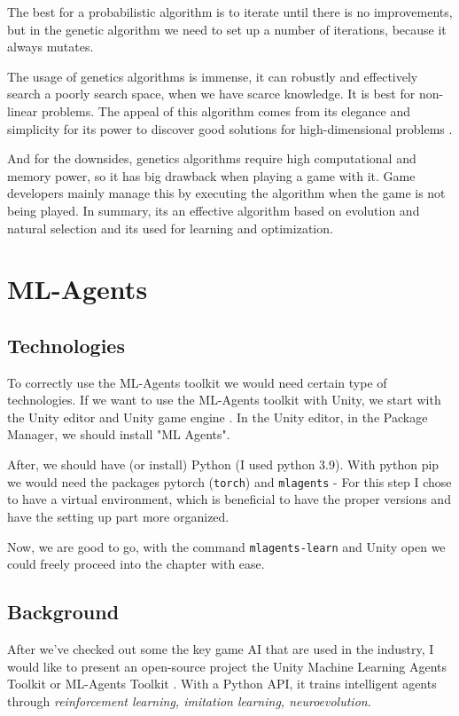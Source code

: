 \documentclass[a4paper, 12pt]{book}
\begin{document}
The best for a probabilistic algorithm is to iterate until there is no improvements, but in the genetic algorithm we need to set up a number of iterations, because it always mutates.

The usage of genetics algorithms is immense, it can robustly and effectively search a poorly search space, when we have scarce knowledge. It is best for non-linear problems. The appeal of this algorithm comes from its elegance and simplicity for its power to discover good solutions for high-dimensional problems \cite{CurrentAIGames}.

And for the downsides, genetics algorithms require high computational and memory power, so it has big drawback when playing a game with it. Game developers mainly manage this by executing the algorithm when the game is not being played. In summary, its an effective algorithm based on evolution and natural selection and its used for learning and optimization.

\chapter{ML-Agents}
\label{ch3}

\section{Technologies}

To correctly use the ML-Agents toolkit we would need certain type of technologies. If we want to use the ML-Agents toolkit with Unity, we start with the Unity editor and Unity game engine \cite{UnitySoftware}. In the Unity editor, in the Package Manager, we should install "ML Agents".

After, we should have (or install) Python \cite{PythonManual} (I used python 3.9). With python pip we would need the packages pytorch (\texttt{torch}) and \texttt{mlagents} - For this step I chose to have a virtual environment, which is beneficial to have the proper versions and have the setting up part more organized.

Now, we are good to go, with the command \texttt{mlagents-learn} and Unity open we could freely proceed into the chapter with ease.

\section{Background}

After we've checked out some the key game AI that are used in the industry, I would like to present an open-source project the Unity Machine Learning Agents Toolkit or ML-Agents Toolkit \cite{MLAgents}. With a Python \cite{PythonManual} API, it trains intelligent agents through \emph{reinforcement learning, imitation learning, neuroevolution}.
\end{document}
